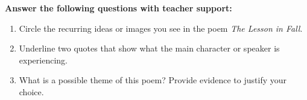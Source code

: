 \documentclass[12pt]{article}
\begin{document}
\vspace{1em}
\begin{tcolorbox}[colframe=black!60, colback=white, 
coltitle=black, colbacktitle=black!15, fonttitle=\bfseries\Large, 
title=Guided Practice, halign title=center, left=10pt, right=10pt, top=10pt, bottom=15pt]



\textbf{Answer the following questions with teacher support:}
\begin{enumerate}[itemsep=1em]
    \item Circle the recurring ideas or images you see in the poem \textit{The Lesson in Fall}.
    \item Underline two quotes that show what the main character or speaker is experiencing.
    \item What is a possible theme of this poem? Provide evidence to justify your choice.
\vspace{7em}
\end{enumerate}
\end{tcolorbox}
\end{document}
